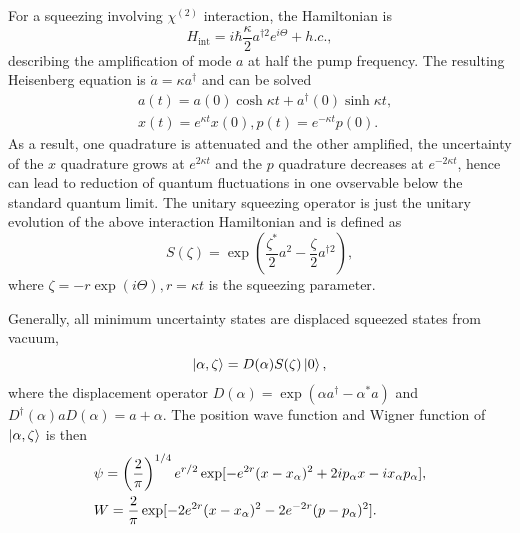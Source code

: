 \documentclass[%
 reprint,
groupedaddress,
showpacs,
 amsmath,amssymb,
 aps,
prb,
]{revtex4-1}
\begin{document}
		For a squeezing involving $ \chi^{(2)} $ interaction, the Hamiltonian is 
		\begin{equation}
		\label{eq:Ham_squeeze}
		H_{\mathrm{int}} = i\hbar \frac{\kappa}{2} a^{\dagger 2} e^{i \Theta} + h.c.,
		\end{equation}
		describing the amplification of mode $a$ at half the pump frequency. The resulting Heisenberg equation is $\dot a = \kappa a^\dagger $ and can be solved
		\begin{eqnarray}
		&a(t) = a(0) \cosh \kappa t + a^\dagger (0) \sinh \kappa t,\\
		&x(t) = e^{\kappa t} x(0), p(t) = e^{-\kappa t}p(0).
		\end{eqnarray}
		As a result, one quadrature is attenuated and the other amplified, the uncertainty of the $x$ quadrature grows at $e^{2 \kappa t} $ and the $p$ quadrature decreases at $ e^{- 2\kappa t} $, hence can lead to reduction of quantum fluctuations in one ovservable below the standard quantum limit. The unitary squeezing operator is just the unitary evolution of the above interaction Hamiltonian and is defined as
		\begin{equation}
		S(\zeta) = \exp \left (\frac{\zeta^*}{2} a^2 - \frac{\zeta}{2} a^{\dagger 2} \right ),
		\end{equation}
		where $\zeta=-r \exp(i \Theta), r=\kappa t $ is the squeezing parameter.

		Generally, all minimum uncertainty states are displaced squeezed states from vacuum,
		\begin{equation}
		\ket{\alpha, \zeta} = D(\alpha) S(\zeta) \ket{0},
		\end{equation}
		where the displacement operator $ D(\alpha) = \exp(\alpha a^\dagger - \alpha^* a ) $ and $ D^\dagger (\alpha) a D(\alpha) = a+\alpha $. The position wave function and Wigner function of $ \ket{\alpha,\zeta} $ is then
		\begin{eqnarray}
			&\psi = \left (\frac{2}{\pi} \right )^{1/4} e^{r/2}\exp[ -e^{2r} (x-x_{\alpha})^2 +2ip_{\alpha}x - ix_{\alpha}p_{\alpha} ], \notag\\
			& W = \frac{2}{\pi} \exp[ -2e^{2r} (x-x_{\alpha})^2 - 2e^{-2r} (p-p_{\alpha})^2 ].
		\end{eqnarray}
\end{document}
